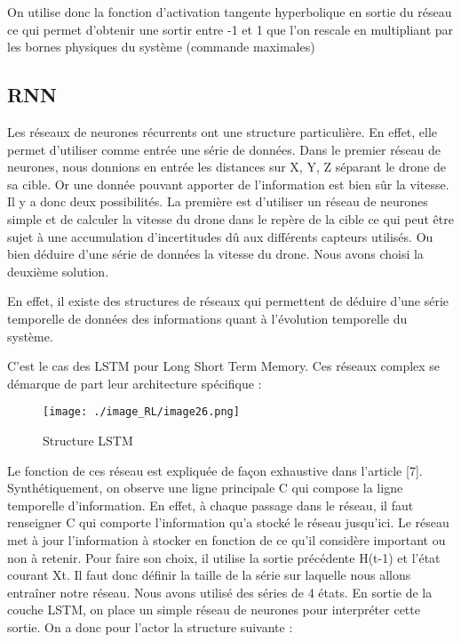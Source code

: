 On utilise donc la fonction d’activation tangente hyperbolique en sortie du réseau ce qui permet d’obtenir une sortir entre -1 et 1 que l’on rescale en multipliant par les bornes physiques du système (commande maximales)

\subsection{RNN}

Les réseaux de neurones récurrents ont une structure particulière. En effet, elle permet d’utiliser comme entrée une série de données. Dans le premier réseau de neurones, nous donnions en entrée les distances sur X, Y, Z séparant le drone de sa cible.
Or une donnée pouvant apporter de l’information est bien sûr la vitesse.
Il y a donc deux possibilités. La première est d'utiliser un réseau de neurones simple et de calculer la vitesse du drone dans le repère de la cible ce qui peut être sujet à une accumulation d’incertitudes dû aux différents capteurs utilisés.
Ou bien déduire d’une série de données la vitesse du drone.
Nous avons choisi la deuxième solution. 

En effet, il existe des structures de réseaux qui permettent de déduire d’une série temporelle de données des informations quant à l’évolution temporelle du système.

C’est le cas des LSTM pour Long Short Term Memory\cite{LSTM}. Ces réseaux complex se démarque de part leur architecture spécifique :

\begin{figure}[H]
    \centering
    \texttt{[image: ./image\_RL/image26.png]}
    \caption{Structure LSTM}
\end{figure}

Le fonction de ces réseau est expliquée de façon exhaustive dans l’article [7].
Synthétiquement, on observe une ligne principale C qui compose la ligne temporelle d’information. En effet, à chaque passage dans le réseau, il faut renseigner C qui comporte l’information qu'a stocké le réseau jusqu’ici. Le réseau met à jour l’information à stocker en fonction de ce qu'il considère important ou non à retenir. Pour faire son choix, il utilise la sortie précédente H(t-1) et l’état courant Xt.
Il faut donc définir la taille de la série sur laquelle nous allons entraîner notre réseau. Nous avons utilisé des séries de 4 états.
En sortie de la couche LSTM, on place un simple réseau de neurones pour interpréter cette sortie.
On a donc pour l’actor la structure suivante :

